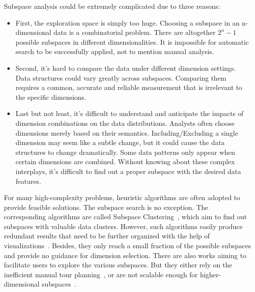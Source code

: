 Subspace analysis could be extremely complicated due to three reasons:
\begin{itemize} 
\item First, the exploration space is simply too huge. Choosing a subspace in an n-dimensional data is a combinatorial problem. There are altogether $2^{n}-1$ possible subspaces in different dimensionalities. It is impossible for automatic search to be successfully applied, not to mention manual analysis.
\item Second, it's hard to compare the data under different dimension settings. Data structures could vary greatly across subspaces. Comparing them requires a common, accurate and reliable measurement that is irrelevant to the specific dimensions.
\item Last but not least, it's difficult to understand and anticipate the impacts of dimension combinations on the data distributions. Analysts often choose dimensions merely based on their semantics. Including/Excluding a single dimension may seem like a subtle change, but it could cause the data structures to change dramatically. Some data patterns only appear when certain dimensions are combined. Without knowing about these complex interplays, it's difficult to find out a proper subspace with the desired data features.
\end{itemize}

For many high-complexity problems, heuristic algorithms are often adopted to provide feasible solutions. The subspace search is no exception. The corresponding algorithms are called Subspace Clustering~\cite{DBLP:conf/sigmod/AgrawalGGR98}, which aim to find out subspaces with valuable data clusters. However, such algorithms easily produce redundant results that need to be further organized with the help of visualizations~\cite{DBLP:conf/ieeevast/TatuMFBSSK12, jackle2017pattern}. Besides, they only reach a small fraction of the possible subspaces and provide no guidance for dimension selection.
There are also works aiming to facilitate users to explore the various subspaces. But they either rely on the inefficient manual tour planning~\cite{DBLP:journals/tvcg/ElmqvistDF08, DBLP:journals/tvcg/YuanRWG13}, or are not scalable enough for higher-dimensional subspaces~\cite{DBLP:conf/apvis/NhonW14}.

